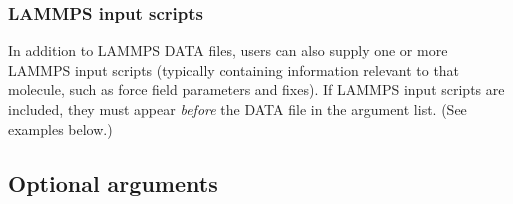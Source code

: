 \documentclass[11pt]{article}
\begin{document}
\subsubsection*{LAMMPS input scripts}

In addition to LAMMPS DATA files, users can also supply
one or more LAMMPS input scripts
(typically containing information relevant to that molecule,
such as force field parameters and fixes).
If LAMMPS input scripts are included, they must appear \textit{before}
the DATA file in the argument list. (See examples below.)

\pagebreak

\subsection{ Optional arguments }
\label{sec:ltemplify_args_table}
\end{document}
